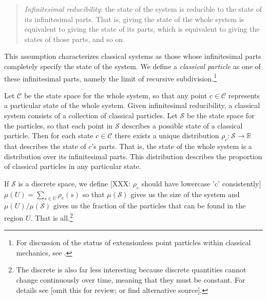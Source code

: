 \documentclass[letterpaper]{article}
\begin{document}
\begin{quotation}
\noindent
\textit{Infinitesimal reducibility}: the state of the system is reducible to the state of its infinitesimal parts. That is, giving the state of the whole system is equivalent to giving the state of its parts, which is equivalent to giving the states of those parts, and so on.
\end{quotation}

\noindent
This assumption characterizes classical systems as those whose infinitesimal parts completely specify the state of the system. We define a \textit{classical particle} as one of these infinitesimal parts, namely the limit of recursive subdivision.\footnote{For discussion of the status of extensionless point particles within classical mechanics, see \textcites[]{Butterfieldpoints}.}

Let $\mathcal{C}$ be the state space for the whole system, so that any point $c \in \mathcal{C}$ represents a particular state of the whole system. Given infinitesimal reducibility, a classical system consists of a collection of classical particles. Let $\mathcal{S}$ be the state space for the particles, so that each point in $\mathcal{S}$ describes a possible state of a classical particle. Then for each state $c \in \mathcal{C}$ there exists a unique distribution $\rho_c : \mathcal{S} \to \mathbb{R} $ that describes the state of $c$'s parts. That is, the state of the whole system is a distribution over its infinitesimal parts. This distribution describes the proportion of classical particles in any particular state.

If $\mathcal{S}$ is a discrete space, we define [XXX: $\rho_c$ should have lowercase 'c' consistently] $\mu(U) = \sum\limits_{s \in U} \rho_c(s)$ so that $\mu(\mathcal{S})$ gives us the size of the system and $\mu(U)/\mu(\mathcal{S})$ gives us the fraction of the particles that can be found in the region $U$. That is all.\footnote{The discrete is also far less interesting because discrete quantities cannot change continuously over time, meaning that they must be constant. For details see \textcites[]{AoPPhy1} [omit this for review; or find alternative source].}
\end{document}
